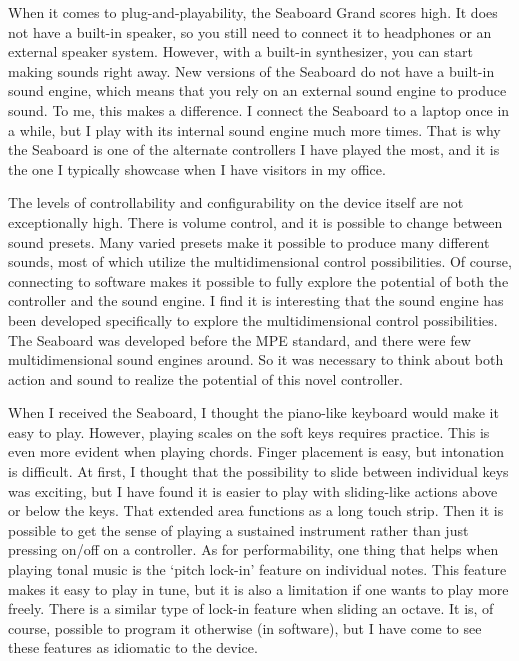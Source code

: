 When it comes to plug-and-playability, the Seaboard Grand scores high. It does not have a built-in speaker, so you still need to connect it to headphones or an external speaker system. However, with a built-in synthesizer, you can start making sounds right away. New versions of the Seaboard do not have a built-in sound engine, which means that you rely on an external sound engine to produce sound. To me, this makes a difference. I connect the Seaboard to a laptop once in a while, but I play with its internal sound engine much more times. That is why the Seaboard is one of the alternate controllers I have played the most, and it is the one I typically showcase when I have visitors in my office.

The levels of controllability and configurability on the device itself are not exceptionally high. There is volume control, and it is possible to change between sound presets. Many varied presets make it possible to produce many different sounds, most of which utilize the multidimensional control possibilities. Of course, connecting to software makes it possible to fully explore the potential of both the controller and the sound engine. I find it is interesting that the sound engine has been developed specifically to explore the multidimensional control possibilities. The Seaboard was developed before the MPE standard, and there were few multidimensional sound engines around. So it was necessary to think about both action and sound to realize the potential of this novel controller.

When I received the Seaboard, I thought the piano-like keyboard would make it easy to play. However, playing scales on the soft keys requires practice. This is even more evident when playing chords. Finger placement is easy, but intonation is difficult. At first, I thought that the possibility to slide between individual keys was exciting, but I have found it is easier to play with sliding-like actions above or below the keys. That extended area functions as a long touch strip. Then it is possible to get the sense of playing a sustained instrument rather than just pressing on/off on a controller.
As for performability, one thing that helps when playing tonal music is the `pitch lock-in' feature on individual notes. This feature makes it easy to play in tune, but it is also a limitation if one wants to play more freely. There is a similar type of lock-in feature when sliding an octave. It is, of course, possible to program it otherwise (in software), but I have come to see these features as idiomatic to the device.

